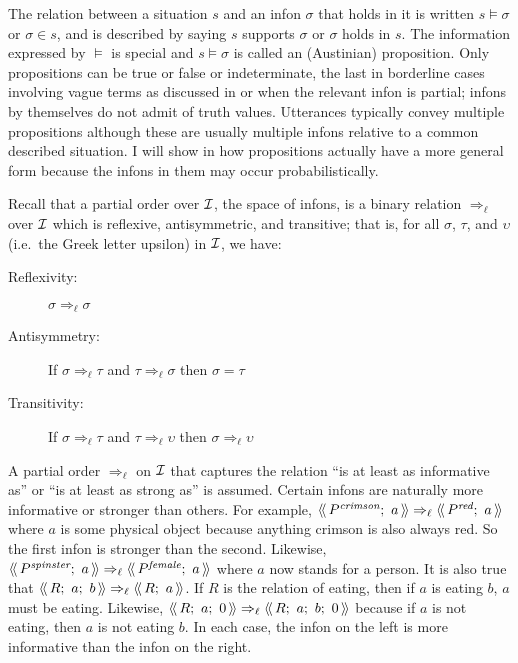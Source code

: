 The relation between a situation $s$ and an infon $\sigma$ that holds in it is written $s \vDash \sigma$  or $\sigma \in s$, and is described by saying $s$ supports $\sigma$ or $\sigma$ holds in $s$. The information expressed by $\vDash$ is special and $s \vDash \sigma$ is called an (Austinian) proposition. Only propositions can be true or false or indeterminate, the last in borderline cases involving vague terms as discussed in  or when the relevant infon is partial; infons by themselves do not admit of truth values. Utterances typically convey multiple propositions although these are usually multiple infons relative to a common described situation. I will show in  how propositions actually have a more general form because the infons in them may occur probabilistically. 






Recall that a partial order over $\cal I$, the space of infons, is a binary relation $\Rightarrow_{\ell}$ over $\cal I$ which is reflexive, antisymmetric, and transitive; that is, for all $\sigma$, $\tau$, and $\upsilon$ (i.e.\ the Greek letter upsilon) in $\cal I$, we have:

\begin{description}
\item[Reflexivity:] $\sigma \Rightarrow_{\ell} \sigma$
\item[Antisymmetry:] If $\sigma \Rightarrow_{\ell} \tau$ and $\tau \Rightarrow_{\ell} \sigma$ then $\sigma = \tau$
\item[Transitivity:] If $\sigma \Rightarrow_{\ell} \tau$ and $\tau \Rightarrow_{\ell} \upsilon$ then $\sigma \Rightarrow_{\ell} \upsilon$
\end{description}\largerpage

A partial order $\Rightarrow_{\ell}$ on $\cal I$ that captures the relation ``is at least as informative as'' or ``is at least as strong as'' is assumed. Certain infons are naturally more informative or stronger than others. For example, $\langle\!\langle\,P^{\emph{crimson}};\ a\,\rangle\!\rangle \Rightarrow_{\ell} \langle\!\langle\,P^{\emph{red}};\ a\,\rangle\!\rangle$ where $a$ is some physical object because anything crimson is also always red. So the first infon is stronger than the second. Likewise, $\langle\!\langle\,P^{\emph{spinster}};\ a\,\rangle\!\rangle \Rightarrow_{\ell} \langle\!\langle\,P^{\emph{female}};\ a\,\rangle\!\rangle$ where $a$ now stands for a person. It is also true that $\soa{R;\ a;\ b} \Rightarrow_\ell \soa{R;\ a}$. If $R$ is the relation of eating, then if $a$ is eating $b$, $a$ must be eating. Likewise, $\langle\!\langle\,R;\ a;\ 0\,\rangle\!\rangle \Rightarrow_\ell \langle\!\langle\,R;\ a;\ b;\ 0\,\rangle\!\rangle$ because if $a$ is not eating, then $a$ is not eating $b$. In each case, the infon on the left is more informative than the infon on the right. 

